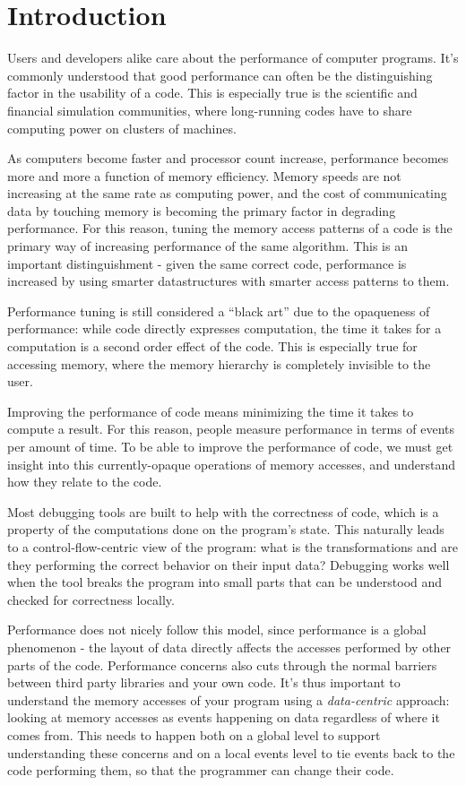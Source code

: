 \documentclass[annual]{acmsiggraph}
\begin{document}
\section{Introduction}
  
  Users and developers alike care about the performance of computer programs. It's commonly understood that good performance can often be the distinguishing factor in the usability of a code. This is especially true is the scientific and financial simulation communities, where long-running codes have to share computing power on clusters of machines.
  
  As computers become faster and processor count increase, performance becomes more and more a function of memory efficiency. Memory speeds are not increasing at the same rate as computing power, and the cost of communicating data by touching memory is becoming the primary factor in degrading performance. For this reason, tuning the memory access patterns of a code is the primary way of increasing performance of the same algorithm. This is an important distinguishment - given the same correct code, performance is increased by using smarter datastructures with smarter access patterns to them.
  
  Performance tuning is still considered a ``black art'' due to the opaqueness of performance: while code directly expresses computation, the time it takes for a computation is a second order effect of the code. This is especially true for accessing memory, where the memory hierarchy is completely invisible to the user.
  
  Improving the performance of code means minimizing the time it takes to compute a result. For this reason, people measure performance in terms of events per amount of time. To be able to improve the performance of code, we must get insight into this currently-opaque operations of memory accesses, and understand how they relate to the code.
  
  Most debugging tools are built to help with the correctness of code, which is a property of the computations done on the program's state. This naturally leads to a control-flow-centric view of the program: what is the transformations and are they performing the correct behavior on their input data? Debugging works well when the tool breaks the program into small parts that can be understood and checked for correctness locally.
  
  Performance does not nicely follow this model, since performance is a global phenomenon - the layout of data directly affects the accesses performed by other parts of the code. Performance concerns also cuts through the normal barriers between third party libraries and your own code. It's thus important to understand the memory accesses of your program using a \emph{data-centric} approach: looking at memory accesses as events happening on data regardless of where it comes from. This needs to happen both on a global level to support understanding these concerns and on a local events level to tie events back to the code performing them, so that the programmer can change their code.
    
\end{document}
